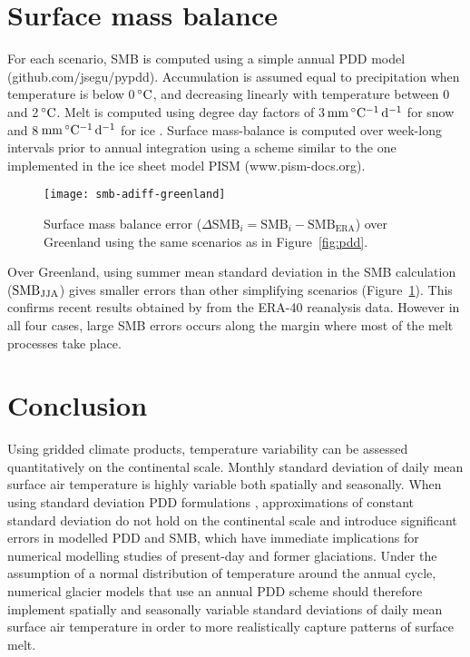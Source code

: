 \documentclass[review]{igs}
\begin{document}

\section{Surface mass balance}

For each scenario, SMB is computed using a simple annual PDD model (github.com/jsegu/pypdd). Accumulation is assumed equal to precipitation when temperature is below 0\,$\rm^\circ C$, and decreasing linearly with temperature between 0 and 2\,$\rm^\circ C$. Melt is computed using degree day factors of 3\,$\rm mm\,^\circ C^{-1}\,d^{-1}$ for snow and 8\,$\rm mm\,^\circ C^{-1}\,d^{-1}$ for ice \citep{huybrechts-dewolde-1999}. Surface mass-balance is computed over week-long intervals prior to annual integration using a scheme similar to the one implemented in the ice sheet model PISM (www.pism-docs.org).

\begin{figure}
  \centering\texttt{[image: smb-adiff-greenland]}
  \caption{Surface mass balance error ($\Delta\mathrm{SMB}_i = \mathrm{SMB}_i - \mathrm{SMB_{ERA}}$) over Greenland using the same scenarios as in Figure~\ref{fig:pdd}.}
  \label{fig:smb}
\end{figure}

Over Greenland, using summer mean standard deviation in the SMB calculation ($\rm SMB_{JJA}$) gives smaller errors than other simplifying scenarios (Figure~\ref{fig:smb}). This confirms recent results obtained by \citet{rau-rogozhina-2013} from the ERA-40 reanalysis data. However in all four cases, large SMB errors occurs along the margin where most of the melt processes take place.


\section{Conclusion}

Using gridded climate products, temperature variability can be assessed quantitatively on the continental scale. Monthly standard deviation of daily mean surface air temperature is highly variable both spatially and seasonally. When using standard deviation PDD formulations \citep{braithwaite-1984,reeh-1991,calov-greve-2005}, approximations of constant standard deviation do not hold on the continental scale and introduce significant errors in modelled PDD and SMB, which have immediate implications for numerical modelling studies of present-day and former glaciations. Under the assumption of a normal distribution of temperature around the annual cycle, numerical glacier models that use an annual PDD scheme should therefore implement spatially and seasonally variable standard deviations of daily mean surface air temperature in order to more realistically capture patterns of surface melt.
\end{document}
